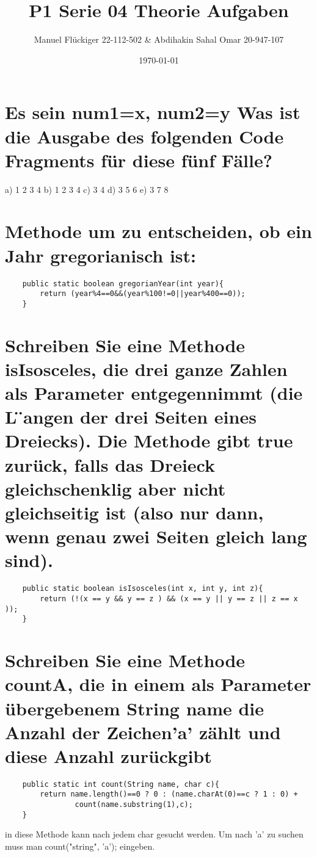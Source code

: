 \documentclass{article}
\author{Manuel Flückiger 22-112-502 & Abdihakin Sahal Omar 20-947-107}
\title{P1 Serie 04 Theorie Aufgaben}
\date{\today}
\begin{document}
\maketitle
\section{Es sein num1=x, num2=y
\newline Was ist die Ausgabe des folgenden Code Fragments für diese fünf Fälle?}
    a) 1 2 3 4 \newline
    b) 1 2 3 4 \newline
    c) 3 4 \newline
    d) 3 5 6 \newline
    e) 3 7 8\newline
\section{Methode um zu entscheiden, ob ein Jahr gregorianisch ist:}
\begin{verbatim}
    public static boolean gregorianYear(int year){
        return (year%4==0&&(year%100!=0||year%400==0));
    }
\end{verbatim}
\section{Schreiben Sie eine Methode isIsosceles, die drei ganze Zahlen als
Parameter entgegennimmt (die L ̈angen der drei Seiten eines Dreiecks). 
Die Methode  gibt true zurück,  falls  das  Dreieck  gleichschenklig 
aber nicht gleichseitig ist (also nur dann, wenn genau zwei Seiten gleich lang sind).}
\begin{verbatim}
    public static boolean isIsosceles(int x, int y, int z){
        return (!(x == y && y == z ) && (x == y || y == z || z == x ));
    }
\end{verbatim}
\section{ Schreiben Sie eine Methode countA, die in einem als Parameter
übergebenem String name die Anzahl der Zeichen'a' zählt und diese Anzahl zurückgibt}
\begin{verbatim}
    public static int count(String name, char c){
        return name.length()==0 ? 0 : (name.charAt(0)==c ? 1 : 0) + 
                count(name.substring(1),c);
    }
\end{verbatim}
in diese Methode kann nach jedem char gesucht werden. Um nach 'a' zu 
suchen muss man count("string", 'a'); eingeben.
\end{document}
